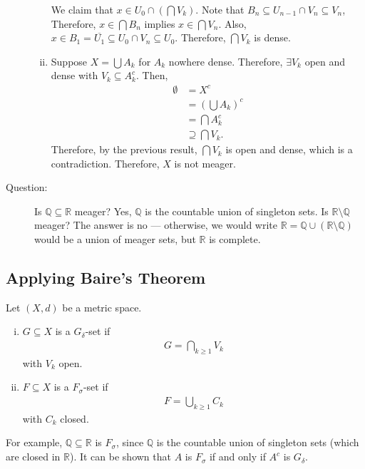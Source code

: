 \documentclass[9pt]{extarticle}
\newcommand{\Q}{\mathbb{Q}}
\newcommand{\R}{\mathbb{R}}
\begin{document}
\begin{description}
\begin{enumerate}[(i)]
          We claim that $x\in U_{0}\cap \left(\bigcap V_k\right)$. Note that $B_n \subseteq U_{n-1}\cap V_n \subseteq V_n$, Therefore, $x\in \bigcap B_n$ implies $x\in \bigcap V_n$. Also, $x\in B_1=\overline{U_1} \subseteq U_0\cap V_n \subseteq U_0$. Therefore, $\bigcap V_k$ is dense.
        \item Suppose $X = \bigcup A_k$ for $A_k$ nowhere dense. Therefore, $\exists V_k$ open and dense with $V_k\subseteq A_k^c$. Then,
          \begin{align*}
            \emptyset &= X^c\\
                      &= \left(\bigcup A_k\right)^c\\
                      &= \bigcap A_k^c\\
                      &\supseteq \bigcap V_k.
          \end{align*}
          Therefore, by the previous result, $\bigcap V_k$ is open and dense, which is a contradiction. Therefore, $X$ is not meager.
      \end{enumerate}
    \item[Question:] Is $\Q\subseteq \R$ meager? Yes, $\Q$ is the countable union of singleton sets. Is $\R\setminus \Q$ meager? The answer is no --- otherwise, we would write $\R = \Q \cup (\R\setminus \Q)$ would be a union of meager sets, but $\R$ is complete.
  \end{description}
  \subsection{Applying Baire's Theorem}%
  Let $(X,d)$ be a metric space.
  \begin{enumerate}[(i)]
    \item $G\subseteq X$ is a $G_{\delta}$-set if
      \begin{align*}
        G = \bigcap_{k\geq 1} V_k
      \end{align*}
      with $V_k$ open.
    \item $F\subseteq X$ is a $F_{\sigma}$-set if
      \begin{align*}
        F = \bigcup_{k\geq 1}C_k
      \end{align*}
      with $C_k$ closed.
  \end{enumerate}
  For example, $\Q\subseteq \R$ is $F_{\sigma}$, since $\Q$ is the countable union of singleton sets (which are closed in $\R$). It can be shown that $A$ is $F_{\sigma}$ if and only if $A^{c}$ is $G_{\delta}$.\\ 
\end{document}
